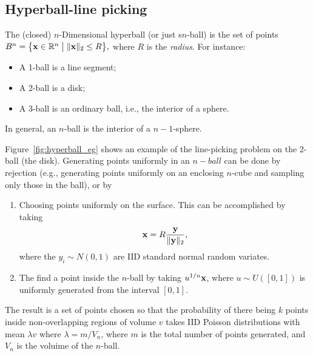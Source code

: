 \subsection{Hyperball-line picking}
\label{sec:hyperball_line}

The (closed) $n$-Dimensional hyperball (or just s$n$-ball) is the set
of points $B^n = \big\{ {\mathbf x} \in \mathbb{R}^n \; \big| \; \|{\mathbf x} \|_2 \leq R
\big\},$ where $R$ is the {\em radius}. For instance:
\begin{itemize}

\item A 1-ball is a line segment;

\item A 2-ball is a disk;

\item A 3-ball is an ordinary ball, i.e., the interior of a sphere.

\end{itemize}
In general, an $n$-ball is the interior of a $n-1$-sphere. 

Figure~\ref{fig:hyperball_eg} shows an example of the line-picking
problem on the 2-ball (the disk). Generating points uniformly in an
$n-ball$ can be done by rejection (e.g., generating points uniformly
on an enclosing $n$-cube and sampling only those in the ball), or by
\begin{enumerate}

\item Choosing points uniformly on the surface. This can be
  accomplished by taking
  \begin{equation}
    \label{eq:x_surface_sphere}
    {\mathbf x} = R \frac{{\mathbf y}}{\| {\mathbf y} \|_2}, 
  \end{equation}
  where the $y_i \sim N(0,1)$ are IID standard normal random variates.

\item The find a point inside the $n$-ball by taking $u^{1/n} {\mathbf x}$,
  where $u \sim U([0,1])$ is uniformly generated from the interval $[0,1]$.

\end{enumerate}
The result is a set of points chosen so that the probability of there
being $k$ points inside non-overlapping regions of volume $v$ takes
IID Poisson distributions with mean $\lambda v$ where $\lambda =
m/V_n$, where $m$ is the total number of points generated, and $V_n$
is the voluime of the $n$-ball.


